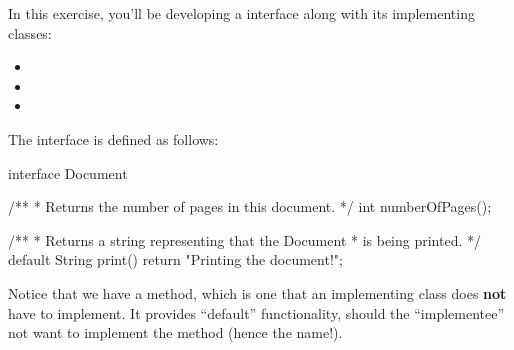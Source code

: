 
 In this exercise, you'll be developing a  interface along with its implementing classes:
\begin{itemize}
\item {}
\item {}
\item {}
\end{itemize}

\noindent The  interface is defined as follows:
\begin{verbnobox}[\small\mbox{}]
interface Document {

  /**
   * Returns the number of pages in this document.
   */
  int numberOfPages();

  /**
   * Returns a string representing that the Document
   * is being printed.
   */
  default String print() {
    return "Printing the document!";
  }
}
\end{verbnobox}

Notice that we have a  method, which is one that an implementing class does \textbf{not} have to implement. It provides ``default'' functionality, should the ``implementee'' not want to implement the method (hence the name!).

